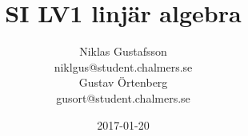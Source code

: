 \documentclass{article}
\title{SI LV1 \small{linjär algebra}}
\author{Niklas Gustafsson \\\small{niklgus@student.chalmers.se} \\
		Gustav Örtenberg \\ \small{gusort@student.chalmers.se}}
\date{2017-01-20}
\begin{document}
\maketitle
\section{}


\section{}


\section{}


\section{}


\section{}


\section{}

\end{document}
